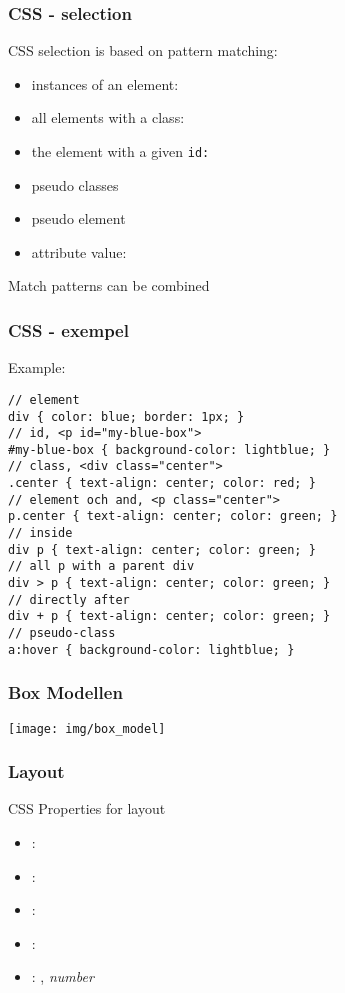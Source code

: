 \begin{frame}[fragile]
\frametitle{CSS - selection}
\color{structure}
CSS selection is based on pattern matching:\\
\begin{itemize}\color{structure}
\item instances of an element: 
\item all elements with a class: 
\item the element with a given \tt{id}: 
\item pseudo classes 
\item pseudo element  
\item attribute value:  
\end{itemize}
Match patterns can be combined
\end{frame}

\begin{frame}[fragile]
\frametitle{CSS - exempel}
\color{structure}
Example:
\begin{lstlisting}[style=htmlcssjs]
// element
div { color: blue; border: 1px; }
// id, <p id="my-blue-box">
#my-blue-box { background-color: lightblue; }
// class, <div class="center">
.center { text-align: center; color: red; }
// element och and, <p class="center">
p.center { text-align: center; color: green; }
// inside
div p { text-align: center; color: green; }
// all p with a parent div
div > p { text-align: center; color: green; }
// directly after
div + p { text-align: center; color: green; }
// pseudo-class
a:hover { background-color: lightblue; }
\end{lstlisting}
\end{frame}

\begin{frame}[fragile]
\frametitle{Box Modellen}
\color{structure}
  \centering
  \texttt{[image: img/box\_model]}

\end{frame}

\begin{frame}[fragile]
\frametitle{Layout}
\color{structure}
CSS Properties for layout
\begin{itemize}
  \item {}: 
  \item {}: 
  \item {}: 
  \item {}: 
  \item {}: , \it{number}
\end{itemize}
\end{frame}

